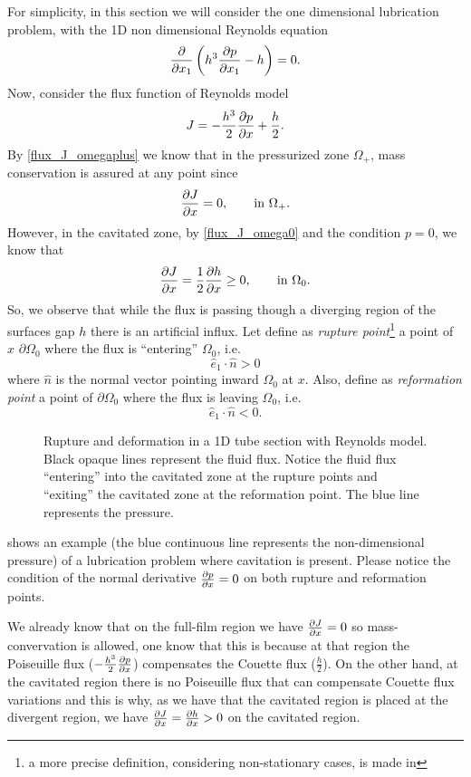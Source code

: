 For simplicity, in this section we will consider the one dimensional lubrication problem, with the 1D non dimensional Reynolds equation
$$\frac{\partial }{\partial x_1}\left( h^3\frac{\partial p}{\partial x_1}-h \right)=0.$$
Now, consider the flux function of Reynolds model
$$J=-\frac{h^3}{2}\frac{\partial p}{\partial x}+\frac{h}{2}.$$
By \eqref{flux_J_omegaplus} we know that in the pressurized zone $\Omega_+$, mass conservation is assured at any point since
$$\frac{\partial J}{\partial x}=0,\qquad \text{in }\Omega_+.$$
However, in the cavitated zone, by \eqref{flux_J_omega0} and the condition $p=0$, we know that
$$\frac{\partial J}{\partial x} =\frac{1}{2}\frac{\partial h}{\partial x}\geq 0,\qquad \text{in }\Omega_0.$$
So, we observe that while the flux is passing though a diverging region of the surfaces gap $h$ there is an artificial influx. Let define as \emph{rupture point}\footnote{a more precise definition, considering non-stationary cases, is made in } a point of $x$ $\partial \Omega_0$ where the flux is ``entering'' $\Omega_0$, i.e. 
$$\hat{e}_1\cdot \hat{n}>0$$
where $\hat{n}$ is the normal vector pointing inward $\Omega_0$ at $x$. Also, define as \emph{reformation point} a point of $\partial \Omega_0$ where the flux is leaving $\Omega_0$, i.e.
$$\hat{e}_1\cdot \hat{n}<0.$$
\begin{figure}[h!]
\centering 
\def\svgwidth{\textwidth}	
\caption[1D rupture and reformation scheme with Reynolds model]{Rupture and deformation in a 1D tube section with Reynolds model. Black opaque lines represent the fluid flux. Notice the fluid flux ``entering'' into the cavitated zone at the rupture points and ``exiting'' the cavitated zone at the reformation point. The blue line represents the pressure.}\label{fig:mass_cons_example1}
\end{figure}
 shows an example (the blue continuous line represents the non-dimensional pressure) of a lubrication problem where cavitation is present. Please notice the condition of the normal derivative $\frac{\partial p}{\partial x}=0$ on both rupture and reformation points.

We already know that on the full-film region we have $\frac{\partial J}{\partial x}=0$ so mass-convervation is allowed, one know that this is because at that region the Poiseuille flux ($-\frac{h^3}{2}\frac{\partial p}{\partial x}$) compensates the Couette flux ($\frac{h}{2}$). On the other hand, at the cavitated region there is no Poiseuille flux that can compensate Couette flux variations and this is why, as we have that the cavitated region is placed at the divergent region, we have $\frac{\partial J}{\partial x}=\frac{\partial h}{\partial x}>0$ on the cavitated region.


